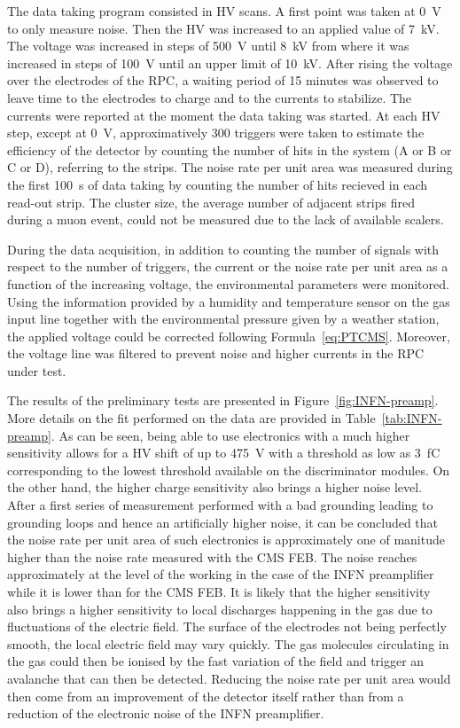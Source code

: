     The data taking program consisted in \acl{HV} scans. A first point was taken at \SI{0}{V} to only measure noise. Then the HV was increased to an applied value of \SI{7}{kV}. The voltage was increased in steps of \SI{500}{V} until \SI{8}{kV} from where it was increased in steps of \SI{100}{V} until an upper limit of \SI{10}{kV}. After rising the voltage over the electrodes of the RPC, a waiting period of 15 minutes was observed to leave time to the electrodes to charge and to the currents to stabilize. The currents were reported at the moment the data taking was started. At each HV step, except at \SI{0}{V}, approximatively 300 triggers were taken to estimate the efficiency of the detector by counting the number of hits in the system (A or B or C or D), referring to the strips. The noise rate per unit area was measured during the first \SI{100}{s} of data taking by counting the number of hits recieved in each read-out strip. The cluster size, the average number of adjacent strips fired during a muon event, could not be measured due to the lack of available scalers.
    
    During the data acquisition, in addition to counting the number of signals with respect to the number of triggers, the current or the noise rate per unit area as a function of the increasing voltage, the environmental parameters were monitored. Using the information provided by a humidity and temperature sensor on the gas input line together with the environmental pressure given by a weather station, the applied voltage could be corrected following Formula~\ref{eq:PTCMS}. Moreover, the voltage line was filtered to prevent noise and higher currents in the RPC under test.
    
    The results of the preliminary tests are presented in Figure~\ref{fig:INFN-preamp}. More details on the fit performed on the data are provided in Table~\ref{tab:INFN-preamp}. As can be seen, being able to use electronics with a much higher sensitivity allows for a HV shift of up to \SI{475}{V} with a threshold as low as \SI{3}{fC} corresponding to the lowest threshold available on the discriminator modules. On the other hand, the higher charge sensitivity also brings a higher noise level. After a first series of measurement performed with a bad grounding leading to grounding loops and hence an artificially higher noise, it can be concluded that the noise rate per unit area of such electronics is approximately one of manitude higher than the noise rate measured with the CMS FEB. The noise reaches approximately  at the level of the working in the case of the INFN preamplifier while it is lower than  for the CMS FEB. It is likely that the higher sensitivity also brings a higher sensitivity to local discharges happening in the gas due to fluctuations of the electric field. The surface of the electrodes not being perfectly smooth, the local electric field may vary quickly. The gas molecules circulating in the gas could then be ionised by the fast variation of the field and trigger an avalanche that can then be detected. Reducing the noise rate per unit area would then come from an improvement of the detector itself rather than from a reduction of the electronic noise of the INFN preamplifier.
	
